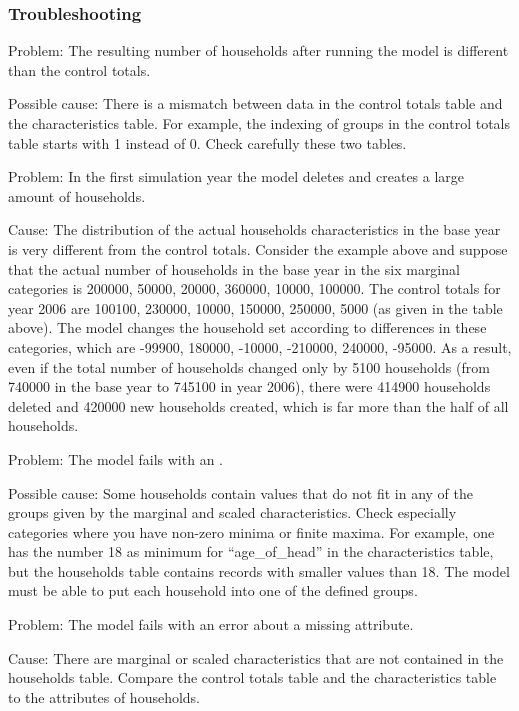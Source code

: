 \subsubsection{Troubleshooting}
%
\begin{description}
\item{Problem:} The resulting number of households after running the model is different than the control totals. 
\item{Possible cause:} 
There is a mismatch between data in the control totals table and the characteristics table. 
For example, the indexing of groups in the control totals table starts with 1 instead of 0. Check 
carefully these two tables.
\item{Problem:} In the first simulation year the model deletes and creates a large amount of households.
\item{Cause:} The distribution of the actual households characteristics in the base year is very different 
from the control totals. Consider the example above and suppose that the actual number of households in the base year in the 
six marginal categories is 200000, 50000, 20000, 360000, 10000, 100000. The control totals for year 2006 are 
100100, 230000, 10000, 150000, 250000, 5000  (as given in the table above). The model changes the household 
set according to differences in these categories, which are -99900,  180000,  -10000, -210000,  240000,  -95000. 
As a result, even if the total number of households changed only by 5100 households (from 740000 in the base year 
to 745100 in year 2006), there were 414900 households deleted and 420000 new households created, which is far more 
than the half of all households.
\item{Problem:} The model fails with an .
\item{Possible cause:} Some households contain values that do not fit in any of the groups given by the marginal and 
scaled characteristics. Check especially categories where you have non-zero minima or finite maxima. For example,
one has the number 18 as minimum for ``age_of_head'' in the characteristics table, but the households table contains 
records with smaller values than 18. The model must be able to put each household into one of the defined groups.
\item{Problem:} The model fails with an error about a missing attribute.
\item{Cause:} There are marginal or scaled characteristics that are not contained in the households table.
Compare the control totals table and the characteristics table to the attributes of households.
\end{description}

